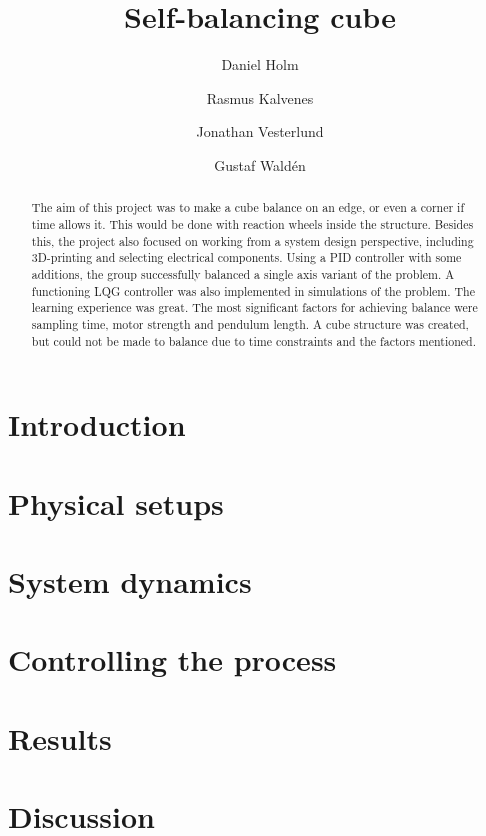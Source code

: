 \documentclass[final]{LTHtwocol}
\begin{document}
\begin{frontmatter}
\title{Self-balancing cube} 
\author[daniel]{Daniel Holm}
\author[rasmus]{Rasmus Kalvenes}
\author[jonathan]{Jonathan Vesterlund}
\author[gustaf]{Gustaf Waldén}



\begin{abstract}
    The aim of this project was to make a cube balance on an edge, or even a corner if time allows it. This would be done with reaction wheels inside the structure. Besides this, the project also focused on working from a system design perspective, including 3D-printing and selecting electrical components. Using a PID controller with some additions, the group successfully balanced a single axis variant of the problem. A functioning LQG controller was also implemented in simulations of the problem. The learning experience was great. The most significant factors for achieving balance were sampling time, motor strength and pendulum length. A cube structure was created, but could not be made to balance due to time constraints and the factors mentioned.
\end{abstract}

\end{frontmatter}

\section{Introduction}
\label{sec:intro}

\section{Physical setups}
\label{sec:setup}

\section{System dynamics}
\label{sec:dynamics}

\section{Controlling the process}
\label{sec:control}

\section{Results}
\label{sec:results}

\section{Discussion}
\label{sec:discussion}

\printbibliography
\end{document}
